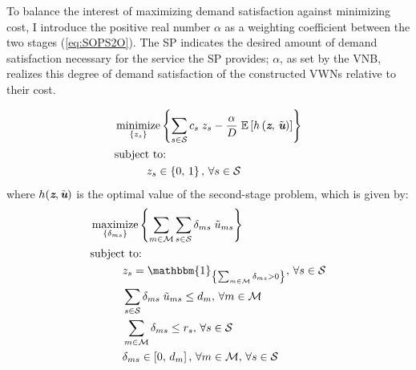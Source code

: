 \documentclass[12pt,dvipsnames]{report}
\newcommand{\ind}[1]{\mathbbm{1}_{\left\{ #1 \right\}}}
\DeclareMathOperator*{\argmin}{minimize}
\DeclareMathOperator*{\argmax}{maximize}
\begin{document}
To balance the interest of maximizing demand satisfaction against minimizing cost, I introduce the positive real number $\alpha$ as a weighting coefficient between the two stages (\cref{eq:SOPS2O}).  The SP indicates the desired amount of demand satisfaction necessary for the service the SP provides; $\alpha$, as set by the VNB, realizes this degree of demand satisfaction of the constructed VWNs relative to their cost.

\begin{tcolorbox}[floatplacement = p, float, title = Two-Stage Stochastic Optimization Program for BS Selection and Adaptive Slicing]
	\begin{align}
		& \argmin_{\left\{ z_s \right\}} \left\{ \sum_{s \in \mathcal{S}} c_s \; z_s - \frac{\alpha}{D} \; \mathbb{E}\left[ h\left( \textit{\textbf{z}},\, \tilde{\textit{\textbf{u}}} \right) \right] \right\} \label{eq:SOPS1O}\\
		& \text{subject to:}  \nonumber \\
		& \hspace{0.4in} z_s \in \left\{ 0,\, 1 \right\},\, \forall s \in \mathcal{S} \label{eq:SOPS1C1}
	\end{align}
	where $h(\textit{\textbf{z}}, \tilde{\textit{\textbf{u}}})$ is the optimal value of the second-stage problem, which is given by:
	\begin{align}
		& \argmax_{\left\{ \delta_{ms} \right\}} \left\{ \sum_{m \in \mathcal{M}} \sum_{s \in \mathcal{S}} \delta_{ms} \; \tilde{u}_{ms} \right\} \label{eq:SOPS2O}\\
		& \text{subject to:}  \nonumber \\
		& \hspace{0.4in} z_s = \ind{\sum_{m \in \mathcal{M}} \delta_{ms} > 0},\, \forall s \in \mathcal{S} \label{eq:SOPS2C1}\\
		& \hspace{0.4in} \sum_{s \in \mathcal{S}} \delta_{ms} \; \tilde{u}_{ms} \leq d_m,\, \forall m \in \mathcal{M} \label{eq:SOPS2C2}\\
		& \hspace{0.4in} \sum_{m \in \mathcal{M}} \delta_{ms} \leq r_s,\, \forall s \in \mathcal{S} \label{eq:SOPS2C3}\\
		& \hspace{0.4in} \delta_{ms} \in \left[ 0,\, d_m \right],\, \forall m \in \mathcal{M},\, \forall s \in \mathcal{S} \label{eq:SOPS2C4}
	\end{align}
\end{tcolorbox}
\end{document}
